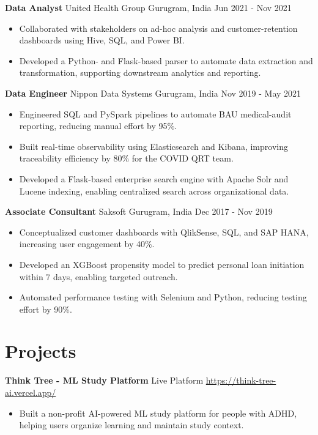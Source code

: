 \documentclass[10pt,a4paper]{article}
\newcommand{\role}[4]{\textbf{#1} \textbar{} #2 \hfill #3 \textbar{} #4\par}
\begin{document}
\vspace{3pt}
\role{Data Analyst}{United Health Group}{Gurugram, India}{Jun 2021 - Nov 2021}
\begin{itemize}
  \item Collaborated with stakeholders on ad-hoc analysis and customer-retention dashboards using Hive, SQL, and Power BI.
  \item Developed a Python- and Flask-based parser to automate data extraction and transformation, supporting downstream analytics and reporting.
\end{itemize}
\vspace{3pt}
\role{Data Engineer}{Nippon Data Systems}{Gurugram, India}{Nov 2019 - May 2021}
\begin{itemize}
  \item Engineered SQL and PySpark pipelines to automate BAU medical-audit reporting, reducing manual effort by 95\%.
  \item Built real-time observability using Elasticsearch and Kibana, improving traceability efficiency by 80\% for the COVID QRT team.
  \item Developed a Flask-based enterprise search engine with Apache Solr and Lucene indexing, enabling centralized search across organizational data.
\end{itemize}
\vspace{3pt}
\role{Associate Consultant}{Saksoft}{Gurugram, India}{Dec 2017 - Nov 2019}
\begin{itemize}
  \item Conceptualized customer dashboards with QlikSense, SQL, and SAP HANA, increasing user engagement by 40\%.
  \item Developed an XGBoost propensity model to predict personal loan initiation within 7 days, enabling targeted outreach.
  \item Automated performance testing with Selenium and Python, reducing testing effort by 90\%.
\end{itemize}


\section{Projects}
\textbf{Think Tree - ML Study Platform} \textbar{} Live Platform \textbar{} \href{https://think-tree-ai.vercel.app/}{https://think-tree-ai.vercel.app/}\par
\begin{itemize}
  \item Built a non-profit AI-powered ML study platform for people with ADHD, helping users organize learning and maintain study context.
\end{itemize}
\end{document}
